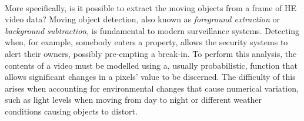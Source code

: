 \smallskip \\ \indent
More specifically, is it possible to extract the moving objects from a frame of HE video data? Moving object detection, also known as \textit{foreground extraction} or \textit{background subtraction}, is fundamental to modern surveillance systems. Detecting when, for example, somebody enters a property, allows the security systems to alert their owners, possibly pre-empting a break-in. To perform this analysis, the contents of a video must be modelled using a, usually probabilistic, function that allows significant changes in a pixels' value to be discerned. The difficulty of this arises when accounting for environmental changes that cause numerical variation, such as light levels when moving from day to night or different weather conditions causing objects to distort.

\setlength{\leftskip}{0cm}


